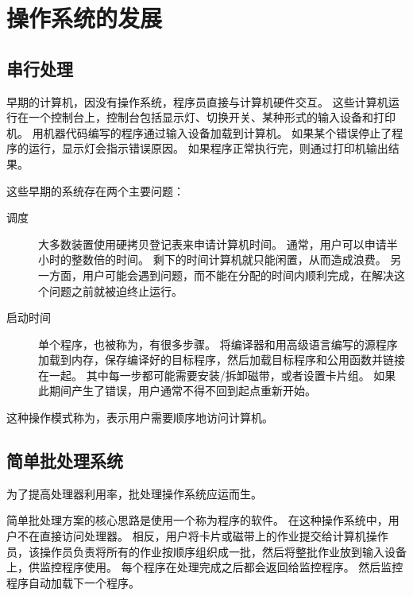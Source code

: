 
\section{操作系统的发展}
{
    \subsection{串行处理}
    {
        早期的计算机，因没有操作系统，程序员直接与计算机硬件交互。
        这些计算机运行在一个控制台上，控制台包括显示灯、切换开关、某种形式的输入设备和打印机。
        用机器代码编写的程序通过输入设备加载到计算机。
        如果某个错误停止了程序的运行，显示灯会指示错误原因。
        如果程序正常执行完，则通过打印机输出结果。

        这些早期的系统存在两个主要问题：

        \begin{description}
            \item[调度]
            {
                大多数装置使用硬拷贝登记表来申请计算机时间。
                通常，用户可以申请半小时的整数倍的时间。
                剩下的时间计算机就只能闲置，从而造成浪费。
                另一方面，用户可能会遇到问题，而不能在分配的时间内顺利完成，在解决这个问题之前就被迫终止运行。
            }
            \item[启动时间]
            {
                单个程序，也被称为，有很多步骤。
                将编译器和用高级语言编写的源程序加载到内存，保存编译好的目标程序，然后加载目标程序和公用函数并链接在一起。
                其中每一步都可能需要安装/拆卸磁带，或者设置卡片组。
                如果此期间产生了错误，用户通常不得不回到起点重新开始。
            }
        \end{description}

        这种操作模式称为，表示用户需要顺序地访问计算机。
    }

    \subsection{简单批处理系统}
    {
        为了提高处理器利用率，批处理操作系统应运而生。

        简单批处理方案的核心思路是使用一个称为程序的软件。
        在这种操作系统中，用户不在直接访问处理器。
        相反，用户将卡片或磁带上的作业提交给计算机操作员，该操作员负责将所有的作业按顺序组织成一批，然后将整批作业放到输入设备上，供监控程序使用。
        每个程序在处理完成之后都会返回给监控程序。
        然后监控程序自动加载下一个程序。

}}
